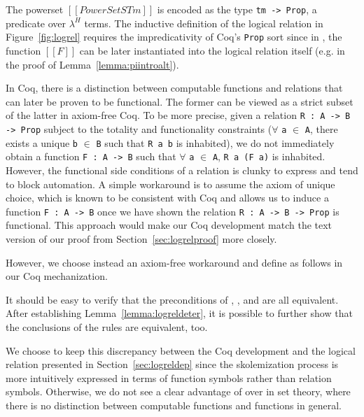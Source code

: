 \documentclass[acmsmall]{acmart}
\newcommand{\lang}{$\lambda^H$\xspace}
\begin{document}
The powerset $[[PowerSet STm]]$ is encoded as the type \texttt{tm ->
Prop}, a predicate over \lang{} terms.
The inductive
definition of the logical relation in Figure~\ref{fig:logrel} requires
the impredicativity of Coq's \texttt{Prop} sort since in ,
the function $[[F]]$ can be later instantiated into the logical
relation itself (e.g. in the proof of Lemma~\ref{lemma:piintroalt}).

In Coq, there is a distinction between computable functions and
relations that can later be proven to be functional. The former can be
viewed as a strict subset of the latter in axiom-free Coq. To be more
precise, given a relation \texttt{R : A -> B -> Prop} subject to the
totality and functionality constraints ($\forall$ \texttt{a} $\in$
\texttt{A}, there exists a unique \texttt{b} $\in$ \texttt{B} such
that \texttt{R a b} is inhabited), we do not immediately obtain a function
\texttt{F : A -> B} such that $\forall$ \texttt{a} $\in$ \texttt{A},
\texttt{R a (F a)} is inhabited. However, the functional side
conditions of a relation is clunky to express and tend to block
automation. A simple workaround is to assume the axiom of unique choice, which
is known to be consistent with Coq and allows us to induce a function \texttt{F
: A -> B} once we have shown the relation \texttt{R : A -> B -> Prop}
is functional. This approach would make our Coq development match
the text version of our proof from Section~\ref{sec:logrelproof} more
closely.

However, we choose instead an axiom-free workaround and define
 as follows in our Coq mechanization.
\begin{center}
\end{center}
It should be easy to verify that the preconditions of
, , and  are all
equivalent. After establishing Lemma~\ref{lemma:logreldeter}, it is
possible to further show that the conclusions of the rules are
equivalent, too.

We choose to keep this discrepancy between the Coq development and the
logical relation presented in Section~\ref{sec:logreldep} since the
skolemization process is more intuitively expressed in terms of
function symbols rather than relation symbols. Otherwise, we do not
see a clear advantage of  over  in set
theory, where there is no distinction between computable functions and
functions in general.
\end{document}
